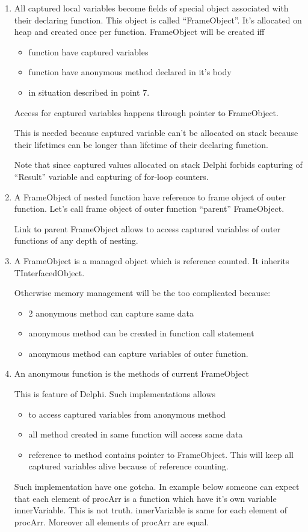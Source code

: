 \documentclass[11pt]{article}
\begin{document}
\begin{enumerate}
\item All captured local variables become fields of special object
   associated with their declaring function.
   This object is called ``FrameObject''. It's allocated on heap and
   created once per function. FrameObject will be created iff
\begin{itemize}
\item function have captured variables
\item function have anonymous method declared in it's body
\item in situation described in point 7.
\end{itemize}
Access for captured variables happens through pointer to FrameObject.

   This is needed because captured variable can't be allocated on stack
   because their lifetimes can be longer than lifetime of their declaring
   function.

   Note that since captured values allocated on stack Delphi forbids
   capturing of ``Result'' variable and capturing of for-loop counters.
\item A FrameObject of nested function have reference to frame object of
   outer function. Let's call frame object of outer function ``parent''
   FrameObject.
   
   Link to parent FrameObject allows to access captured variables of
   outer functions of any depth of nesting.
\item A FrameObject is a managed object which is reference counted. It
   inherits TInterfacedObject.

   Otherwise memory management will be the too complicated because:
\begin{itemize}
\item 2 anonymous method can capture same data
\item anonymous method can be created in function call statement
\item anonymous method can capture variables of outer function.
\end{itemize}
\item An anonymous function is the methods of current FrameObject

   This is feature of Delphi. Such implementations allows
\begin{itemize}
\item to access captured variables from anonymous method
\item all method created in same function will access same data
\item reference to method contains pointer to FrameObject. This will
     keep all captured variables alive because of reference counting.
\end{itemize}
Such implementation have one gotcha. In example below someone can
   expect that each element of procArr is a function which have it's own
   variable innerVariable. This is not truth. innerVariable is same
   for each element of procArr. Moreover all elements of procArr are equal.


\end{enumerate}
\end{document}
